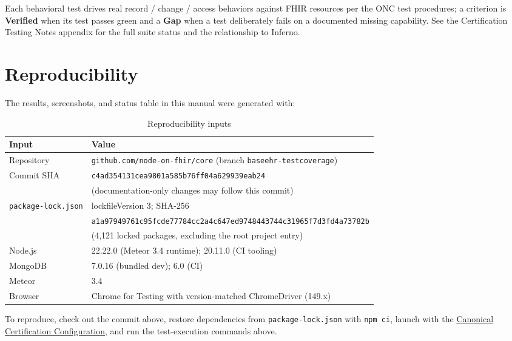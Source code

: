 Each behavioral test drives real record / change / access behaviors against
FHIR resources per the ONC test procedures; a criterion is \textbf{Verified}
when its test passes green and a \textbf{Gap} when a test deliberately fails on a
documented missing capability. See the Certification Testing Notes appendix for
the full suite status and the relationship to Inferno.

\section{Reproducibility}
\label{sec:reproducibility}

The results, screenshots, and status table in this manual were generated with:

\begin{table}[h]
\centering
\begin{tabular}{ll}
\toprule
\textbf{Input} & \textbf{Value} \\
\midrule
Repository       & \texttt{github.com/node-on-fhir/core} (branch \texttt{baseehr-testcoverage}) \\
Commit SHA       & \texttt{c4ad354131cea9801a585b76ff04a629939eab24} \\
                 & (documentation-only changes may follow this commit) \\
\texttt{package-lock.json} & lockfileVersion 3; SHA-256 \\
                 & \texttt{a1a97949761c95fcde77784cc2a4c647ed9748443744c31965f7d3fd4a73782b} \\
                 & (4{,}121 locked packages, excluding the root project entry) \\
Node.js          & 22.22.0 (Meteor 3.4 runtime); 20.11.0 (CI tooling) \\
MongoDB          & 7.0.16 (bundled dev); 6.0 (CI) \\
Meteor           & 3.4 \\
Browser          & Chrome for Testing with version-matched ChromeDriver (149.x) \\
\bottomrule
\end{tabular}
\caption{Reproducibility inputs}
\end{table}

To reproduce, check out the commit above, restore dependencies from
\texttt{package-lock.json} with \texttt{npm ci}, launch with the
\hyperref[sec:cert-config]{Canonical Certification Configuration}, and run the
test-execution commands above.

